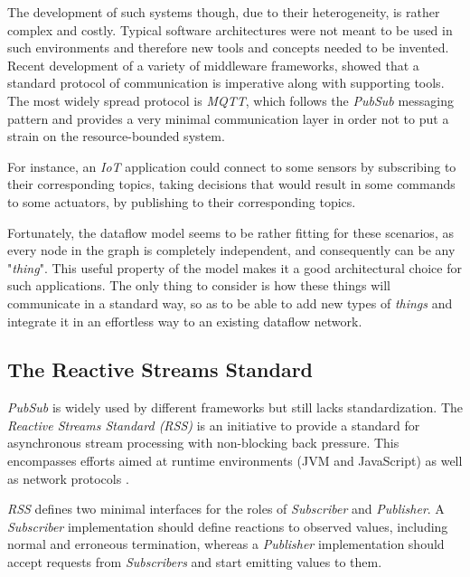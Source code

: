 \documentclass[sigplan,review,anonymous]{acmart}\settopmatter{printfolios=true}
\begin{document}
The development of such systems though, due to their heterogeneity, is rather complex and costly. Typical software architectures were not meant to be used in such environments and therefore new tools and concepts needed to be invented. Recent development of a variety of middleware frameworks, showed that a standard protocol of communication is imperative along with supporting tools\cite{iot_middleware}. The most widely spread protocol is \textit{MQTT}, which follows the \textit{PubSub} messaging pattern and provides a very minimal communication layer in order not to put a strain on the resource-bounded system\cite{mqtt}. 

For instance, an \textit{IoT} application could connect to some sensors by subscribing to their corresponding topics, taking decisions that would result in some commands to some actuators, by publishing to their corresponding topics.

Fortunately, the dataflow model seems to be rather fitting for these scenarios\cite{iot_dataflow}, as every node in the graph is completely independent, and consequently can be any "\textit{thing}". This useful property of the model makes it a good architectural choice for such applications. The only thing to consider is how these things will communicate in a standard way, so as to be able to add new types of \textit{things} and integrate it in an effortless way to an existing dataflow network.

\subsection{The Reactive Streams Standard}

\textit{PubSub} is widely used by different frameworks but still lacks standardization. The \textit{Reactive Streams Standard (RSS)} is an initiative to provide a standard for asynchronous stream processing with non-blocking back pressure. This encompasses efforts aimed at runtime environments (JVM and JavaScript) as well as network protocols \cite{rss}.

\textit{RSS} defines two minimal interfaces for the roles of \textit{Subscriber} and \textit{Publisher}. A \textit{Subscriber} implementation should define reactions to observed values, including normal and erroneous termination, whereas a \textit{Publisher} implementation should accept requests from \textit{Subscribers} and start emitting values to them.
\end{document}
